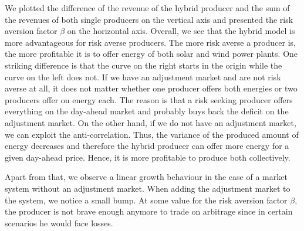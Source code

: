 We plotted the difference of the revenue of the hybrid producer and the sum of the revenues of both single producers on the vertical axis and presented the risk aversion factor $\beta$ on the horizontal axis. Overall, we see that the hybrid model is more advantageous for risk averse producers. The more risk averse a producer is, the more profitable it is to offer energy of both solar and wind power plants. One striking difference is that the curve on the right starts in the origin while the curve on the left does not. If we have an adjustment market and are not risk averse at all, it does not matter whether one producer offers both energies or two producers offer on energy each. The reason is that a risk seeking producer offers everything on the day-ahead market and probably buys back the deficit on the adjustment market. On the other hand, if we do not have an adjustment market, we can exploit the anti-correlation. Thus, the variance of the produced amount of energy decreases and therefore the hybrid producer can offer more energy for a given day-ahead price. Hence, it is more profitable to produce both collectively. 

Apart from that, we observe a linear growth behaviour in the case of a market system without an adjustment market. When adding the adjustment market to the system, we notice a small bump. At some value for the risk aversion factor $\beta$, the producer is not brave enough anymore to trade on arbitrage since in certain scenarios he would face losses. 
